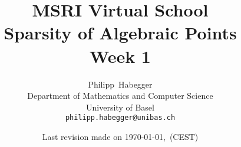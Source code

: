 \documentclass{scrbook}
\begin{document}
\title{MSRI Virtual School \\ Sparsity of Algebraic Points \\ Week 1}
\author{Philipp~Habegger \\ Department of Mathematics and Computer
  Science \\ University of Basel \\ \texttt{philipp.habegger@unibas.ch}}
\date{Last revision made on \today, \currenttime \,(CEST)}



\maketitle
\tableofcontents

\setcounter{chapter}{-1}















\vfill\hfill\texttt{}
\end{document}
